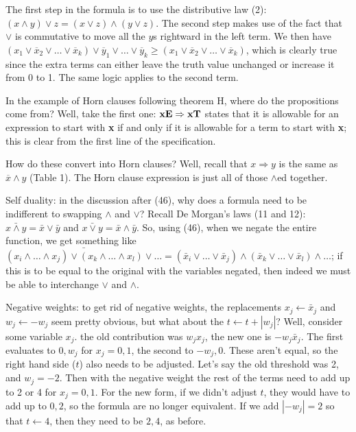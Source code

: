 
 \hfil\break
The first step in the formula is to use the 
distributive law (2): $\left(x \wedge y\right) \vee z = \left(x \vee z\right) 
\wedge \left(y \vee z\right)$.
The second step makes use of the fact that $\vee$ is commutative to move all the $y$s 
rightward in the left term.  We then have $\left(x_1 \vee \overline{x}_2
\vee \ldots \vee \overline{x}_k\right) \vee \overline{y}_1 \vee \ldots \vee 
\overline{y}_k
\geq \left(x_1 \vee \overline{x}_2 \vee \ldots \vee \overline{x}_k\right)$,
which is clearly true since the extra terms can either leave the truth value 
unchanged or increase it from 0 to 1.  The same logic applies to the second term.

 In the example of Horn clauses following theorem H, where 
do the propositions come from? \hfil\break  
Well, take the first one: $\bf xE \Rightarrow xT$ states
that it is allowable for an expression to start with {\bf x} if and only if
it is allowable for a term to start with {\bf x}; this is clear from the first
line of the specification.  

How do these convert into Horn clauses?  Well, recall that $x \Rightarrow y$
is the same as $\overline{x} \wedge y$ (Table 1).  The Horn clause expression is
just all of those $\wedge$ed together.


 Self duality: in the discussion after (46), why does a formula
need to be indifferent to swapping $\wedge$ and $\vee$?  Recall De Morgan's
laws (11 and 12): $\bar{x \wedge y} = \bar x \vee \bar y$ and $\bar{x \vee y} =
\bar x \wedge \bar y$.  So, using (46), when we negate the entire function,
we get something like $\bar{\left(x_i \wedge \ldots \wedge x_j\right) \vee
\left(x_k \wedge \ldots \wedge x_l\right) \vee \ldots} =
\left(\bar x_i \vee \ldots \vee \bar x_j\right) \wedge
\left(\bar x_k \vee \ldots \vee \bar x_l\right) \wedge \ldots$;
if this is to be equal to the original with the variables negated, then
indeed we must be able to interchange $\vee$ and $\wedge$.


\noindent [p75] Negative weights: to get rid of negative weights,
the replacements $x_j \gets \bar x_j$ and $w_j \gets -w_j$ seem
pretty obvious, but what about the $t \gets t + \left|w_j\right|$?
Well, consider some variable $x_j$.  the old contribution was
$w_j x_j$, the new one is $-w_j \bar x_j$.  The first evaluates to
$0, w_j$ for $x_j = 0, 1$, the second to $-w_j, 0$.  These aren't
equal, so the right hand side ($t$) also needs to be adjusted.
Let's say the old threshold was 2, and $w_j = -2$.  Then with
the negative weight the rest of the terms need to add up to 2 or 4
for $x_j = 0, 1$.  For the new form, if we didn't adjust $t$, they
would have to add up to $0, 2$, so the formula are no longer
equivalent.  If we add $\left|-w_j\right| = 2$ so that $t \gets 4$,
then they need to be $2, 4$, as before.

